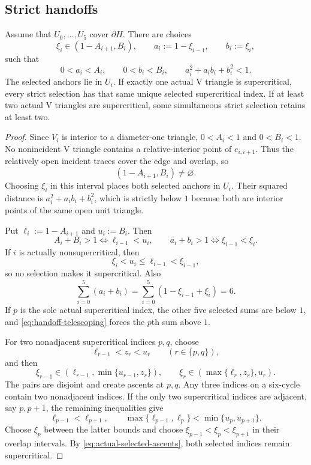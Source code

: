 \subsection{Strict handoffs}

\begin{proposition}
\label{prop:strict-handoffs}
\label{lem:app-strict-handoff-selection}

Assume that $U_0,\ldots,U_5$ cover $\partial H$.  There are choices
\[
 \xi_i\in(1-A_{i+1},B_i),\qquad
 a_i:=1-\xi_{i-1},\qquad b_i:=\xi_i,
\]
such that
\[
 0<a_i<A_i,\qquad0<b_i<B_i,\qquad
 a_i^2+a_ib_i+b_i^2<1.
\]
The selected anchors lie in $U_i$.  If exactly one actual V triangle is
supercritical, every strict selection has that same unique selected
supercritical index.  If at least two actual V triangles are supercritical,
some simultaneous strict selection retains at least two.
\end{proposition}
\begin{proof}
Since $V_i$ is interior to a diameter-one triangle,
$0<A_i<1$ and $0<B_i<1$.  No nonincident V triangle contains a
relative-interior point of $e_{i,i+1}$.  Thus the relatively open incident
traces cover the edge and overlap, so
\[
 (1-A_{i+1},B_i)\ne\varnothing.
\]
Choosing $\xi_i$ in this interval places both selected anchors in $U_i$.
Their squared distance is $a_i^2+a_ib_i+b_i^2$, which is strictly below $1$
because both are interior points of the same open unit triangle.

Put $\ell_i:=1-A_{i+1}$ and $u_i:=B_i$.  Then
\begin{equation}
 A_i+B_i>1\iff\ell_{i-1}<u_i,
 \qquad a_i+b_i>1\iff\xi_{i-1}<\xi_i.
 \label{eq:actual-selected-ascents}
\end{equation}
If $i$ is actually nonsupercritical, then
\[
 \xi_i<u_i\le\ell_{i-1}<\xi_{i-1},
\]
so no selection makes it supercritical.  Also
\begin{equation}
 \sum_{i=0}^5(a_i+b_i)
 =\sum_{i=0}^5(1-\xi_{i-1}+\xi_i)=6.
 \label{eq:handoff-telescoping}
\end{equation}
If $p$ is the sole actual supercritical index, the other five selected sums
are below $1$, and \eqref{eq:handoff-telescoping} forces the $p$th sum above
$1$.

For two nonadjacent supercritical indices $p,q$, choose
\[
 \ell_{r-1}<z_r<u_r\qquad(r\in\{p,q\}),
\]
and then
\[
 \xi_{r-1}\in(\ell_{r-1},\min\{u_{r-1},z_r\}),
 \qquad
 \xi_r\in(\max\{\ell_r,z_r\},u_r).
\]
The pairs are disjoint and create ascents at $p,q$.  Any three indices on a
six-cycle contain two nonadjacent indices.  If the only two supercritical
indices are adjacent, say $p,p+1$, the remaining inequalities give
\[
 \ell_{p-1}<\ell_{p+1},
 \qquad
 \max\{\ell_{p-1},\ell_p\}<\min\{u_p,u_{p+1}\}.
\]
Choose $\xi_p$ between the latter bounds and choose
$\xi_{p-1}<\xi_p<\xi_{p+1}$ in their overlap intervals.  By
\eqref{eq:actual-selected-ascents}, both selected indices remain
supercritical.
\end{proof}

